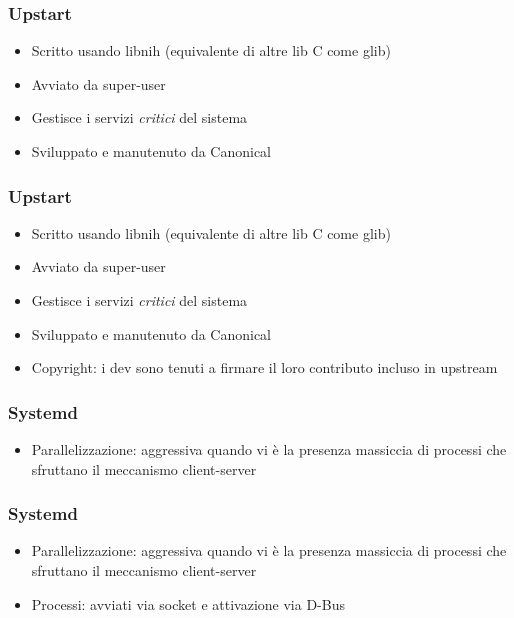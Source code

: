 \documentclass{beamer}
\begin{document}

\begin{frame}
	\frametitle{Upstart}
	\begin{itemize}
		\item Scritto usando libnih (equivalente di altre lib C come glib)
		\item Avviato da super-user
		\item Gestisce i servizi \textit{critici} del sistema
		\item Sviluppato e manutenuto da Canonical
	\end{itemize}
\end{frame}


\begin{frame}
	\frametitle{Upstart}
	\begin{itemize}
		\item Scritto usando libnih (equivalente di altre lib C come glib)
		\item Avviato da super-user
		\item Gestisce i servizi \textit{critici} del sistema
		\item Sviluppato e manutenuto da Canonical
		\item Copyright: i dev sono tenuti a firmare il loro contributo incluso in upstream	
	\end{itemize}
\end{frame}


\begin{frame}
\frametitle{Systemd}
\begin{itemize}
	\item Parallelizzazione: aggressiva quando vi \`e la presenza massiccia di processi che sfruttano il meccanismo client-server
\end{itemize}
\end{frame}


\begin{frame}
	\frametitle{Systemd}
	\begin{itemize}
		\item Parallelizzazione: aggressiva quando vi \`e la presenza massiccia di processi che sfruttano il meccanismo client-server
		\item Processi: avviati via socket e attivazione via D-Bus
	\end{itemize}
\end{frame}
\end{document}

